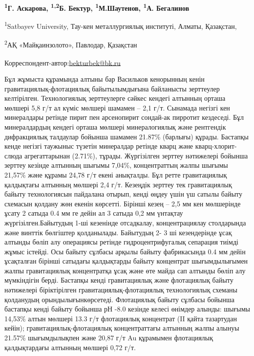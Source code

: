 

\begin{articleheader}

{\bfseries \textsuperscript{1}Г. Аскарова, \textsuperscript{1,2}Б.
Бектур\textsuperscript{\envelope }, \textsuperscript{1}М.Шаутенов,
\textsuperscript{1}А. Бегалинов}
\end{articleheader}
\begin{affiliation}

\textsuperscript{1}Satbayev University, Тау-кен металлургиялық
институті, Алматы, Қазақстан,

\textsuperscript{2}АҚ «Майқаинзолото», Павлодар, Қазақстан

\raggedright{\bfseries \textsuperscript{\envelope }}Корреспондент-автор:\href{mailto:bekturbek@bk.run}{bekturbek@bk.ru}
\end{affiliation}

Бұл жұмыста құрамында алтыны бар Васильков кенорынның кенін
гравитациялық-флотациялық байытылымдығына байланысты зерттеулер
келтірілген. Технологиялық зерттеулерге сәйкес кендегі алтынның орташа
мөлшері 5,8 г/т ал күміс мөлшері шамамен -- 2,1 г/т. Сынамада негізгі
кен минералдары ретінде пирит пен арсенопирит сондай-ак пирротит
кездеседі. Бұл минералдардың кендегі орташа мөлшері минералогиялық және
рентгендік дифракциялық талдаулар бойынша шамамен 21.87\% (барлығы)
құрады. Бастапқы кенде негізгі таужыныс түзетін минералдар ретінде кварц
және кварц-хлорит-слюда агрегаттарынан (2.71\%), тұрады. Жүргізілген
зерттеу нәтижелері бойынша зерттеу кезінде алтынның шығымы 7,04\%,
концентраттың жалпы шығымы 21,57\% және құрамы 24,78 г/т екені
анықталды. Бұл ретте гравитациялық қалдықтағы алтынның мөлшері 2,4 г/т.
Кезеңдік зерттеу тек гравитациялық байыту технологиясын пайдалана
отырып, кенді өңдеу үшін үш сатылы байыту схемасын қолдану жөн екенін
көрсетті. Бірінші кезең -- 2,5 мм кен мөлшерінде ұсату 2 сатыда 0.4 мм
ге дейін ал 3 сатыда 0,2 мм үнтақтау жүргізілген.Байытудың 1-ші
кезенінде отсадкалау, концентрациялау столдарында және винттік бөлгіштер
қолданылады. Байытудың 2- 3 ші кезендерінде ұсақ алтынды бөліп алу
операциясы ретінде гидроцентрифугалық сепарация тиімді жұмыс істейді.
Осы байыту сұлбасы арқылы байыту фабрикасында 0.4 мм дейін ұсақталған
бірінші сатыдағы қалдықтарды байыту концентрат шығымдылығымен жалпы
гравитациялық концентратқа ұсақ және өте майда сап алтынды бөліп алу
мүмкіндігін берді. Бастапқы кенді гравитациялық және флотациялық байыту
нәтижелері біріктірілген гравитациялық-флотациялық технологиялық схеманы
қолданудың орындылығынкөрсетеді. Флотациялық байыту сұлбасы бойынша
бастапқы кенді байыту бойынша рН -8.0 кезінде келесі өнімдер алынды:
шығымы 14,53\% алтын мөлшері 13.3 г/т флотациялық концентрат (II қайта тазартудан кейін);
гравитациялық-флотациялық концентраттағы алтынның жалпы алынуы 21.57\%
шығымдылықпен және 20,87 г/т Au құрамымен флотациялық қалдықтардағы
алтынның мөлшері 0,72 г/т.

